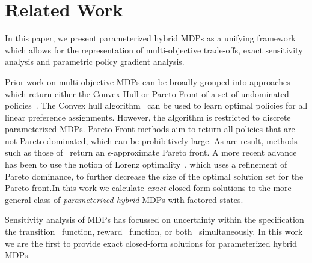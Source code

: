 \section{Related Work}
\label{sec:background}


In this paper, we present parameterized hybrid MDPs as a unifying framework which allows for the representation of multi-objective trade-offs, exact sensitivity analysis and parametric policy gradient analysis. 

Prior work on multi-objective MDPs can be broadly grouped into approaches which return either the Convex Hull or Pareto Front of a set of undominated policies~\parencite{Roijers_JAIR_2013}. The Convex hull algorithm~\parencite{Barrett_ICML_2008} can be used to learn optimal policies for all linear preference assignments. However, the algorithm is restricted to discrete parameterized MDPs. 
Pareto Front methods aim to return all policies that are not Pareto dominated, which can be prohibitively large. As are result, methods such as those of~\parencite{Chatterjee_STACS_2006} return an $\epsilon$-approximate Pareto front. A more recent advance has been to use the notion of Lorenz optimality~\parencite{Perny_AAAI_2013}, which uses a refinement of Pareto dominance, to further decrease the size of the optimal solution set for the Pareto front.In this work we calculate \textit{exact} closed-form solutions to the more general class of \textit{parameterized hybrid} MDPs with factored states. 

Sensitivity analysis of MDPs has focussed on uncertainty within the specification the transition~\parencite{Kalyanasundaram_AJC_2004} function, reward~\parencite{Tan_JAP_2011, Hopp_JOTA_1988} function, or both~\parencite{Givan_AI_2000} simultaneously. In this work we are the first to provide exact closed-form solutions for parameterized hybrid MDPs.

